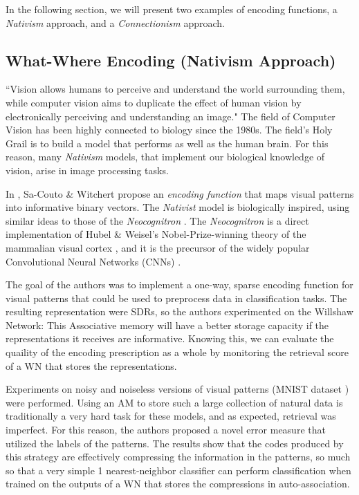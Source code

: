 \documentclass[runningheads]{llncs}
\begin{document}
In the following section, we will present two examples of encoding functions, a \textit{Nativism} approach, and a \textit{Connectionism} approach.

\subsection{What-Where Encoding (Nativism Approach)}
\label{sec:prescriptions_WW}
``Vision allows humans to perceive and understand the world surrounding them, while computer vision aims to duplicate the effect of human vision by electronically perceiving and understanding an image." \cite{sonka2014image}
The field of Computer Vision has been highly connected to biology \cite{marr1982vision} since the 1980s. The field's Holy Grail is to build a model that performs as well as the human brain. For this reason, many \textit{Nativism} models, that implement our biological knowledge of vision, arise in image processing tasks.

In \cite{sa2020storing}, Sa-Couto \& Witchert propose an \textit{encoding function} that maps visual patterns into informative binary vectors. The \textit{Nativist} model is biologically inspired, using similar ideas to those of the \textit{Neocognitron} \cite{fukushima1988neocognitron}. The \textit{Neocognitron} is a direct implementation of Hubel \& Weisel's Nobel-Prize-winning theory of the mammalian visual cortex \cite{hubel1962receptive}, and it is the precursor of the widely popular Convolutional Neural Networks (CNNs) \cite{lecun1989backpropagation}.

The goal of the authors was to implement a one-way, sparse encoding function for visual patterns that could be used to preprocess data in classification tasks. The resulting representation were SDRs, so the authors experimented on the Willshaw Network: This Associative memory will have a better storage capacity if the representations it receives are informative. Knowing this, we can evaluate the quaility of the encoding prescription as a whole by monitoring the retrieval score of a WN that stores the representations.

Experiments on noisy and noiseless versions of visual patterns (MNIST dataset \cite{lecun1998mnist}) were performed. Using an AM to store such a large collection of natural data is traditionally a very hard task for these models, and as expected, retrieval was imperfect. For this reason, the authors proposed a novel error measure that utilized the labels of the patterns. The results show that the codes produced by this strategy are effectively compressing the information in the patterns, so much so that a very simple 1 nearest-neighbor classifier can perform classification when trained on the outputs of a WN that stores the compressions in auto-association.
\newline
\end{document}
